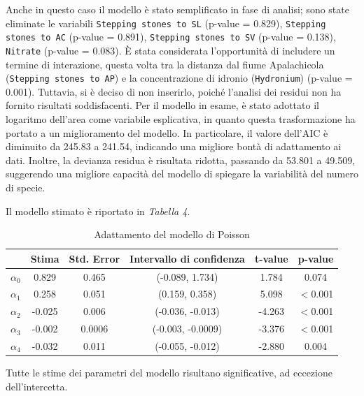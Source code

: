 \documentclass{article} %
\begin{document}
Anche in questo caso il modello è stato semplificato in fase di analisi; sono state eliminate le variabili \texttt{Stepping stones to SL} (p-value = 0.829), \texttt{Stepping stones to AC} (p-value = 0.891), \texttt{Stepping stones to SV} (p-value = 0.138), \texttt{Nitrate} (p-value = 0.083).  
È stata considerata l'opportunità di includere un termine di interazione, questa volta tra la distanza dal fiume Apalachicola (\texttt{Stepping stones to AP}) e la concentrazione di idronio (\texttt{Hydronium}) (p-value = 0.001). Tuttavia, si è deciso di non inserirlo, poiché l'analisi dei residui non ha fornito risultati soddisfacenti.
Per il modello in esame, è stato adottato il logaritmo dell'area come variabile esplicativa, in quanto questa trasformazione ha portato a un miglioramento del modello. In particolare, il valore dell'AIC è diminuito da 245.83 a 241.54, indicando una migliore bontà di adattamento ai dati. Inoltre, la devianza residua è risultata ridotta, passando da 53.801 a 49.509, suggerendo una migliore capacità del modello di spiegare la variabilità del numero di specie.

Il modello stimato è riportato in \textit{Tabella 4}.
\begin{table}[H]
    \centering
    \renewcommand{\arraystretch}{1.4} %
    \begin{tabular}{lccccc}
        \toprule
        &  Stima &  Std. Error &  Intervallo di confidenza & t-value &  p-value \\
        \midrule  
            $\alpha_0$  & 0.829  & 0.465  & (-0.089, 1.734) & 1.784 & 0.074  \\
            $\alpha_1$     & 0.258  & 0.051  & (0.159, 0.358) & 5.098 & $<$0.001 \\
            $\alpha_2$          & -0.025 & 0.006  & (-0.036, -0.013) &-4.263 & $<$0.001 \\
            $\alpha_3$          & -0.002 & 0.0006  & (-0.003, -0.0009) & -3.376 & $<$0.001 \\
            $\alpha_4$          & -0.032 & 0.011  & (-0.055, -0.012) & -2.880 & 0.004 \\
        \bottomrule
    \end{tabular}
    \caption{Adattamento del modello di Poisson}
\end{table}

Tutte le stime dei parametri del modello risultano significative, ad eccezione dell'intercetta.
\end{document}
